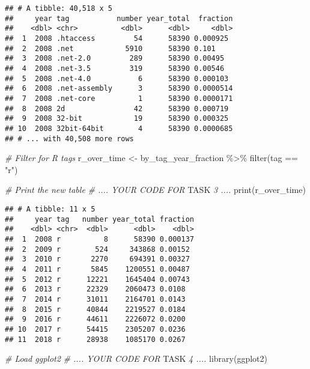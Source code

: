 \documentclass[
]{article}
\newenvironment{Shaded}{\begin{snugshade}}{\end{snugshade}}
\newcommand{\AlertTok}[1]{\textcolor[rgb]{0.94,0.16,0.16}{#1}}
\newcommand{\CommentTok}[1]{\textcolor[rgb]{0.56,0.35,0.01}{\textit{#1}}}
\newcommand{\FunctionTok}[1]{\textcolor[rgb]{0.00,0.00,0.00}{#1}}
\newcommand{\NormalTok}[1]{#1}
\newcommand{\OtherTok}[1]{\textcolor[rgb]{0.56,0.35,0.01}{#1}}
\newcommand{\SpecialCharTok}[1]{\textcolor[rgb]{0.00,0.00,0.00}{#1}}
\newcommand{\StringTok}[1]{\textcolor[rgb]{0.31,0.60,0.02}{#1}}
\begin{document}
\begin{verbatim}
## # A tibble: 40,518 x 5
##     year tag           number year_total  fraction
##    <dbl> <chr>          <dbl>      <dbl>     <dbl>
##  1  2008 .htaccess         54      58390 0.000925 
##  2  2008 .net            5910      58390 0.101    
##  3  2008 .net-2.0         289      58390 0.00495  
##  4  2008 .net-3.5         319      58390 0.00546  
##  5  2008 .net-4.0           6      58390 0.000103 
##  6  2008 .net-assembly      3      58390 0.0000514
##  7  2008 .net-core          1      58390 0.0000171
##  8  2008 2d                42      58390 0.000719 
##  9  2008 32-bit            19      58390 0.000325 
## 10  2008 32bit-64bit        4      58390 0.0000685
## # ... with 40,508 more rows
\end{verbatim}

\begin{Shaded}
\begin{Highlighting}[]
\CommentTok{\# Filter for R tags}
\NormalTok{r\_over\_time }\OtherTok{\textless{}{-}}\NormalTok{ by\_tag\_year\_fraction }\SpecialCharTok{\%\textgreater{}\%}
  \FunctionTok{filter}\NormalTok{(tag }\SpecialCharTok{==} \StringTok{"r"}\NormalTok{)}

\CommentTok{\# Print the new table}
\CommentTok{\# .... YOUR CODE FOR }\AlertTok{TASK}\CommentTok{ 3 ....}
\FunctionTok{print}\NormalTok{(r\_over\_time)}
\end{Highlighting}
\end{Shaded}

\begin{verbatim}
## # A tibble: 11 x 5
##     year tag   number year_total fraction
##    <dbl> <chr>  <dbl>      <dbl>    <dbl>
##  1  2008 r          8      58390 0.000137
##  2  2009 r        524     343868 0.00152 
##  3  2010 r       2270     694391 0.00327 
##  4  2011 r       5845    1200551 0.00487 
##  5  2012 r      12221    1645404 0.00743 
##  6  2013 r      22329    2060473 0.0108  
##  7  2014 r      31011    2164701 0.0143  
##  8  2015 r      40844    2219527 0.0184  
##  9  2016 r      44611    2226072 0.0200  
## 10  2017 r      54415    2305207 0.0236  
## 11  2018 r      28938    1085170 0.0267
\end{verbatim}

\begin{Shaded}
\begin{Highlighting}[]
\CommentTok{\# Load ggplot2}
\CommentTok{\# .... YOUR CODE FOR }\AlertTok{TASK}\CommentTok{ 4 ....}
\FunctionTok{library}\NormalTok{(ggplot2)}
\end{Highlighting}
\end{Shaded}
\end{document}
